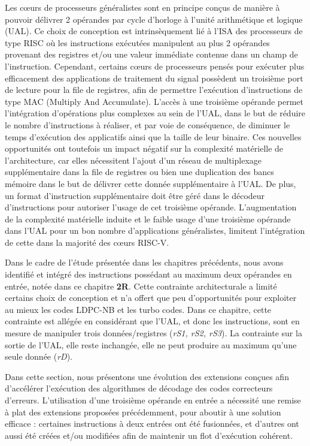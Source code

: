 \documentclass[../main.tex]{subfiles}
\begin{document}
Les cœurs de processeurs généralistes sont en principe conçus de manière à pouvoir délivrer 2 opérandes par cycle d'horloge à l'unité arithmétique et logique (UAL). 
Ce choix de conception est intrinsèquement lié à l'ISA des processeurs de type RISC où les instructions exécutées manipulent au plus 2 opérandes provenant des registres et/ou une valeur immédiate contenue dans un champ de l'instruction.
Cependant, certains cœurs de processeurs pensés pour exécuter plus efficacement des applications de traitement du signal possèdent un troisième port de lecture pour la file de registres, afin de permettre l'exécution d'instructions de type MAC (Multiply And Accumulate).
L'accès à une troisième opérande permet l'intégration d'opérations plus complexes au sein de l'UAL, dans le but de réduire le nombre d'instructions à réaliser, et par voie de conséquence, de diminuer le temps d'exécution des applicatifs ainsi que la taille de leur binaire.
Ces nouvelles opportunités ont toutefois un impact négatif sur la complexité matérielle de l'architecture, car elles nécessitent l'ajout d'un réseau de multiplexage supplémentaire dans la file de registres ou bien une duplication des bancs mémoire dans le but de délivrer cette donnée supplémentaire à l'UAL.
De plus, un format d'instruction supplémentaire doit être géré dans le décodeur d'instructions pour autoriser l'usage de cet troisième opérande.
L'augmentation de la complexité matérielle induite et le faible usage d'une troisième opérande dans l'UAL pour un bon nombre d'applications généralistes, limitent l'intégration de cette dans la majorité des cœurs RISC-V.


Dans le cadre de l'étude présentée dans les chapitres précédents, nous avons identifié et intégré des instructions possédant au maximum deux opérandes en entrée, notée dans ce chapitre \textbf{2R}.
Cette contrainte architecturale a limité certains choix de conception et n'a offert que peu d'opportunités pour exploiter au mieux les codes LDPC-NB et les turbo codes.
Dans ce chapitre, cette contrainte est allégée en considérant que l'UAL, et donc les instructions, sont en mesure de manipuler trois données/registres (\textit{rS1, rS2, rS3}).
La contrainte sur la sortie de l'UAL, elle reste inchangée, elle ne peut produire au maximum qu'une seule donnée (\textit{rD}).

Dans cette section, nous présentons une évolution des extensions conçues afin d'accélérer l'exécution des algorithmes de décodage des codes correcteurs d'erreurs.
L'utilisation d'une troisième opérande en entrée a nécessité une remise à plat des extensions proposées précédemment, pour aboutir à une solution efficace : certaines instructions à deux entrées ont été fusionnées, et d'autres ont aussi été créées et/ou modifiées afin de maintenir un flot d'exécution cohérent.
\end{document}
